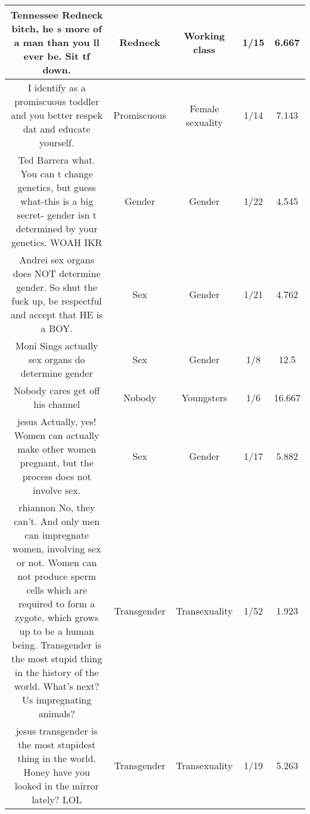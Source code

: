\documentclass[11pt]{article}
\newlength\mylength
\begin{document}
\begin{center}
\begin{longtable}{|C{.40\mylength}|C{.30\mylength}|C{.15\mylength}|C{.15\mylength}|C{.15\mylength}|}
  Tennessee Redneck bitch, he s more of a man than you ll ever be. Sit tf down.  & Redneck & Working class & 1/15 & 6.667 \\  \hline
  I identify as a promiscuous toddler and you better respek dat and educate yourself.  & Promiscuous & Female sexuality & 1/14 & 7.143 \\  \hline
  Ted Barrera what. You can t change genetics, but guess what-this is a big secret- gender isn t determined by your genetics. WOAH IKR  & Gender & Gender & 1/22 & 4.545 \\  \hline
  Andrei sex organs does NOT determine gender. So shut the fuck up, be respectful and accept that HE is a BOY.  & Sex & Gender & 1/21 & 4.762 \\  \hline
  Moni Sings actually sex organs do determine gender  & Sex & Gender & 1/8 & 12.5 \\  \hline
  Nobody cares get off his channel  & Nobody & Youngsters & 1/6 & 16.667 \\  \hline
  jesus Actually, yes! Women can actually make other women pregnant, but the process does not involve sex.  & Sex & Gender & 1/17 & 5.882 \\  \hline
  rhiannon No, they can't. And only men can impregnate women, involving sex or not. Women can not produce sperm cells which are required to form a zygote, which grows up to be a human being. Transgender is the most stupid thing in the history of the world. What's next? Us impregnating animals?  & Transgender & Transexuality & 1/52 & 1.923 \\  \hline
  jesus  transgender is the most stupidest thing in the world.  Honey have you looked in the mirror lately? LOL  & Transgender & Transexuality & 1/19 & 5.263 \\  \hline

\end{longtable}
\end{center}
\end{document}
